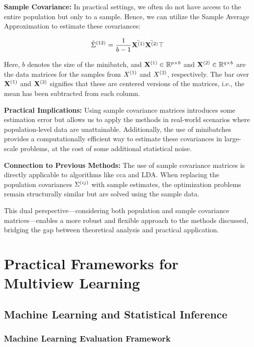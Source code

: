 \textbf{Sample Covariance:} In practical settings, we often do not have access to the entire population but only to a sample. Hence, we can utilize the Sample Average Approximation to estimate these covariances:

\[
    \hat{\Sigma}^{(12)} = \frac{1}{b-1} \bar{\mathbf{X}^{(1)}} \bar{\mathbf{X}^{(2)}}\top
\]

Here, \(b\) denotes the size of the minibatch, and \(\mathbf{X}^{(1)} \in \mathbb{R}^{p \times b}\) and \(\mathbf{X}^{(2)} \in \mathbb{R}^{q \times b}\) are the data matrices for the samples from \(X^{(1)}\) and \(X^{(2)}\), respectively. The bar over \(\mathbf{X}^{(1)}\) and \(\mathbf{X}^{(2)}\) signifies that these are centered versions of the matrices, i.e., the mean has been subtracted from each column.

\textbf{Practical Implications:} Using sample covariance matrices introduces some estimation error but allows us to apply the methods in real-world scenarios where population-level data are unattainable. Additionally, the use of minibatches provides a computationally efficient way to estimate these covariances in large-scale problems, at the cost of some additional statistical noise.

\textbf{Connection to Previous Methods:} The use of sample covariance matrices is directly applicable to algorithms like \acrshort{cca} and LDA. When replacing the population covariances \(\Sigma^{(ij)}\) with sample estimates, the optimization problems remain structurally similar but are solved using the sample data.

This dual perspective—considering both population and sample covariance matrices—enables a more robust and flexible approach to the methods discussed, bridging the gap between theoretical analysis and practical application.


\section{Practical Frameworks for Multiview Learning}

\subsection{Machine Learning and Statistical Inference}

\subsubsection{Machine Learning Evaluation Framework}

